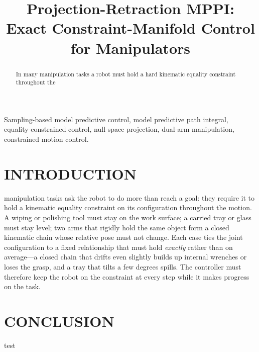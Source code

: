 \documentclass[lettersize,journal]{IEEEtran}
\theoremstyle{remark}
\begin{document}
\title{Projection-Retraction MPPI: \\ Exact Constraint-Manifold Control for Manipulators}


\maketitle

\begin{abstract}
In many manipulation tasks a robot must hold a hard kinematic equality constraint throughout the
\end{abstract}

\begin{IEEEkeywords}
Sampling-based model predictive control, model predictive path integral, equality-constrained
control, null-space projection, dual-arm manipulation, constrained motion control.
\end{IEEEkeywords}

\section{INTRODUCTION}
\label{sec:intro}
 manipulation tasks ask the robot to do more than reach a goal: they require
it to hold a kinematic equality constraint on its configuration throughout the motion. A wiping or
polishing tool must stay on the work surface; a carried tray or glass must stay level; two arms
that rigidly hold the same object form a closed kinematic chain whose relative pose must not
change. Each case ties the joint configuration to a fixed relationship that must hold
\emph{exactly} rather than on average---a closed chain that drifts even slightly
builds up internal wrenches or loses the grasp, and a tray that tilts a few degrees spills. The
controller must therefore keep the robot on the constraint at every step while it makes progress on
the task.


\section{CONCLUSION}
\label{sec:conclusion}
test\cite{bishop2006pattern}



\end{document}

